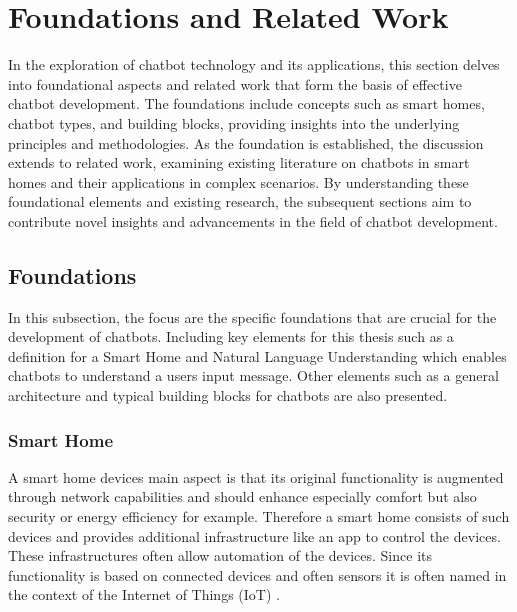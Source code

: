 
\chapter{Foundations and Related Work}
\label{chap:ch2}
\label{chap:foundation}

In the exploration of chatbot technology and its applications, this section delves into foundational aspects and related work that form the basis of effective chatbot development. 
The foundations include concepts such as smart homes, chatbot types, and building blocks, providing insights into the underlying principles and methodologies. 
As the foundation is established, the discussion extends to related work, examining existing literature on chatbots in smart homes and their applications in complex scenarios. 
By understanding these foundational elements and existing research, the subsequent sections aim to contribute novel insights and advancements in the field of chatbot development.

\section{Foundations}
\label{sec:foundation}
In this subsection, the focus are the specific foundations that are crucial for the development of chatbots.
Including key elements for this thesis such as a definition for a Smart Home and Natural Language Understanding which enables chatbots to understand a users input message.
Other elements such as a general architecture and typical building blocks for chatbots are also presented.

\subsection{Smart Home} 
A smart home devices main aspect is that its original functionality is augmented through network capabilities \cite{schiefer_smart_2015,balakrishnan_smart_2018} and should enhance especially comfort\cite{matsui_information_2018, balakrishnan_smart_2018} but also security\cite{balakrishnan_smart_2018} or energy efficiency\cite{matsui_information_2018, balakrishnan_smart_2018} for example. 
Therefore a smart home consists of such devices and provides additional infrastructure like an app to control the devices. 
These infrastructures often allow automation of the devices.
Since its functionality is based on connected devices and often sensors it is often named in the context of the Internet of Things (IoT) \cite{atzori_internet_2010}. 

